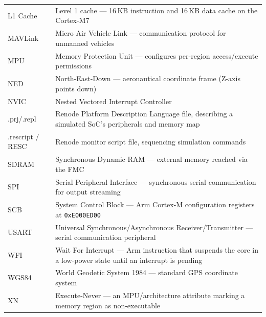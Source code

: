 \begin{longtable}{@{}p{3.2cm}p{10.8cm}@{}}
L1 Cache & Level 1 cache --- 16\,KB instruction and 16\,KB data cache on the Cortex-M7 \\
MAVLink & Micro Air Vehicle Link --- communication protocol for unmanned vehicles \\
MPU & Memory Protection Unit --- configures per-region access/execute permissions \\
NED & North-East-Down --- aeronautical coordinate frame (Z-axis points down) \\
NVIC & Nested Vectored Interrupt Controller \\
.prj/.repl & Renode Platform Description Language file, describing a simulated SoC's peripherals and memory map \\
.rescript / RESC & Renode monitor script file, sequencing simulation commands \\
SDRAM & Synchronous Dynamic RAM --- external memory reached via the FMC \\
SPI & Serial Peripheral Interface --- synchronous serial communication for output streaming \\
SCB & System Control Block --- Arm Cortex-M configuration registers at \texttt{0xE000ED00} \\
USART & Universal Synchronous/Asynchronous Receiver/Transmitter --- serial communication peripheral \\
WFI & Wait For Interrupt --- Arm instruction that suspends the core in a low-power state until an interrupt is pending \\
WGS84 & World Geodetic System 1984 --- standard GPS coordinate system \\
XN & Execute-Never --- an MPU/architecture attribute marking a memory region as non-executable \\
\bottomrule
\end{longtable}